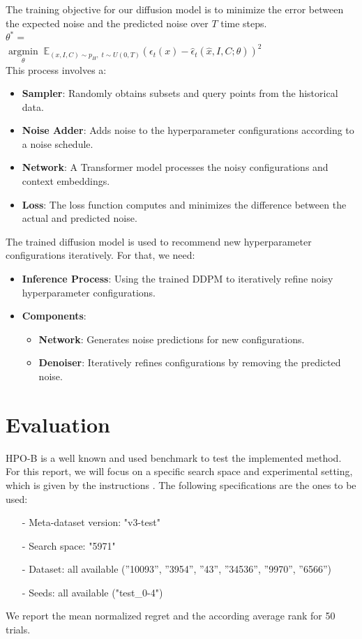 \documentclass[10pt,a4paper,twocolumn]{article}
\begin{document}
{The training objective for our diffusion model is to minimize the error between the expected noise and the predicted noise over \(T\) time steps.\\
$\theta^*=$ \\
$\underset{\theta}{\operatorname{argmin}} \; \mathbb{E}_{(x, I, C) \sim p_H, \; t \sim U(0, T)} \left( \epsilon_t(x) - \hat{\epsilon}_t(\hat{x}, I, C ; \theta) \right)^2$
\\
This process involves a:
\begin{itemize}
  \item \textbf{Sampler}: Randomly obtains subsets and query points from the historical data.
  \item \textbf{Noise Adder}: Adds noise to the hyperparameter configurations according to a noise schedule.
  \item \textbf{Network}: A Transformer model processes the noisy configurations and context embeddings.
  \item \textbf{Loss}: The loss function computes and minimizes the difference between the actual and predicted noise.
\end{itemize}
The trained diffusion model is used to recommend new hyperparameter configurations iteratively. For that, we need:
\begin{itemize}
  \item \textbf{Inference Process}: Using the trained DDPM to iteratively refine noisy hyperparameter configurations.
  \item \textbf{Components}:
  \begin{itemize}
    \item \textbf{Network}: Generates noise predictions for new configurations.
    \item \textbf{Denoiser}: Iteratively refines configurations by removing the predicted noise.
  \end{itemize}
\end{itemize}

\section{Evaluation}
HPO-B is a well known and used benchmark to test the implemented method. For this report, we will focus on a specific search space and experimental setting, which is given by the instructions \cite{grabocka2024diffusers}.
\vspace{5pt}
The following specifications are the ones to be used:
\begin{enumerate}
    \item [-] Meta-dataset version: "v3-test"
    \item [-] Search space: "5971"
    \item [-] Dataset: all available (”10093”, ”3954”, ”43”, ”34536”, ”9970”, ”6566”)
    \item [-] Seeds: all available ("test\_0-4")   
\end{enumerate}
We report the mean normalized regret and the according average rank for 50 trials.

}
\end{document}
